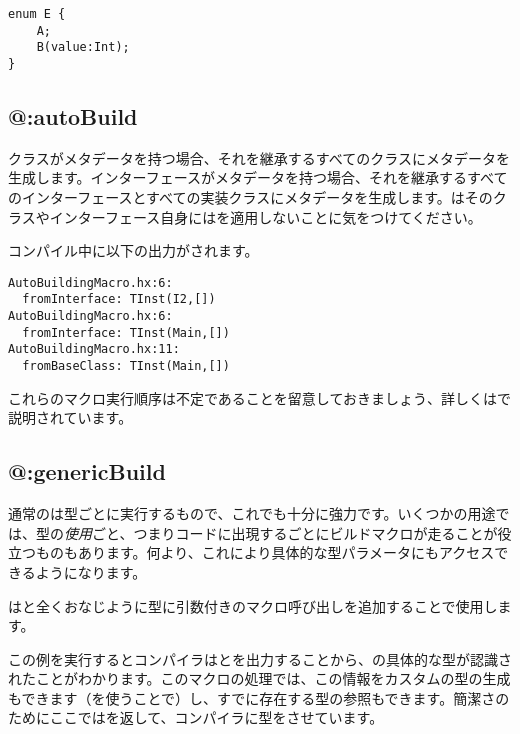 \begin{lstlisting}
enum E {
	A;
	B(value:Int);
}
\end{lstlisting}


\subsection{@:autoBuild}
\label{macro-auto-build}

クラスがメタデータを持つ場合、それを継承するすべてのクラスにメタデータを生成します。インターフェースがメタデータを持つ場合、それを継承するすべてのインターフェースとすべての実装クラスにメタデータを生成します。はそのクラスやインターフェース自身にはを適用しないことに気をつけてください。


コンパイル中に以下の出力がされます。

\begin{lstlisting}
AutoBuildingMacro.hx:6:
  fromInterface: TInst(I2,[])
AutoBuildingMacro.hx:6:
  fromInterface: TInst(Main,[])
AutoBuildingMacro.hx:11:
  fromBaseClass: TInst(Main,[])
\end{lstlisting}

これらのマクロ実行順序は不定であることを留意しておきましょう、詳しくはで説明されています。


\subsection{@:genericBuild}
\label{macro-generic-build}

通常のは型ごとに実行するもので、これでも十分に強力です。いくつかの用途では、型の\emph{使用}ごと、つまりコードに出現するごとにビルドマクロが走ることが役立つものもあります。何より、これにより具体的な型パラメータにもアクセスできるようになります。

はと全くおなじように型に引数付きのマクロ呼び出しを追加することで使用します。


この例を実行するとコンパイラはとを出力することから、の具体的な型が認識されたことがわかります。このマクロの処理では、この情報をカスタムの型の生成もできます（を使うことで）し、すでに存在する型の参照もできます。簡潔さのためにここではを返して、コンパイラに型をさせています。

